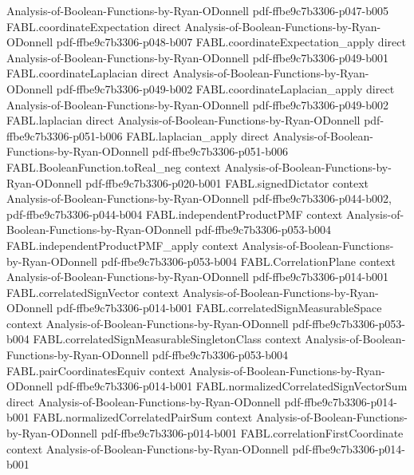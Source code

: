 \begin{theorem}
  {Analysis-of-Boolean-Functions-by-Ryan-ODonnell}
  {pdf-ffbe9c7b3306-p047-b005}
\proofstep
  {FABL.coordinateExpectation}
  {direct}
  {Analysis-of-Boolean-Functions-by-Ryan-ODonnell}
  {pdf-ffbe9c7b3306-p048-b007}
\proofstep
  {FABL.coordinateExpectation_apply}
  {direct}
  {Analysis-of-Boolean-Functions-by-Ryan-ODonnell}
  {pdf-ffbe9c7b3306-p049-b001}
\proofstep
  {FABL.coordinateLaplacian}
  {direct}
  {Analysis-of-Boolean-Functions-by-Ryan-ODonnell}
  {pdf-ffbe9c7b3306-p049-b002}
\proofstep
  {FABL.coordinateLaplacian_apply}
  {direct}
  {Analysis-of-Boolean-Functions-by-Ryan-ODonnell}
  {pdf-ffbe9c7b3306-p049-b002}
\proofstep
  {FABL.laplacian}
  {direct}
  {Analysis-of-Boolean-Functions-by-Ryan-ODonnell}
  {pdf-ffbe9c7b3306-p051-b006}
\proofstep
  {FABL.laplacian_apply}
  {direct}
  {Analysis-of-Boolean-Functions-by-Ryan-ODonnell}
  {pdf-ffbe9c7b3306-p051-b006}
\proofstep
  {FABL.BooleanFunction.toReal_neg}
  {context}
  {Analysis-of-Boolean-Functions-by-Ryan-ODonnell}
  {pdf-ffbe9c7b3306-p020-b001}
\proofstep
  {FABL.signedDictator}
  {context}
  {Analysis-of-Boolean-Functions-by-Ryan-ODonnell}
  {pdf-ffbe9c7b3306-p044-b002,
    pdf-ffbe9c7b3306-p044-b004}
\proofstep
  {FABL.independentProductPMF}
  {context}
  {Analysis-of-Boolean-Functions-by-Ryan-ODonnell}
  {pdf-ffbe9c7b3306-p053-b004}
\proofstep
  {FABL.independentProductPMF_apply}
  {context}
  {Analysis-of-Boolean-Functions-by-Ryan-ODonnell}
  {pdf-ffbe9c7b3306-p053-b004}
\proofstep
  {FABL.CorrelationPlane}
  {context}
  {Analysis-of-Boolean-Functions-by-Ryan-ODonnell}
  {pdf-ffbe9c7b3306-p014-b001}
\proofstep
  {FABL.correlatedSignVector}
  {context}
  {Analysis-of-Boolean-Functions-by-Ryan-ODonnell}
  {pdf-ffbe9c7b3306-p014-b001}
\proofstep
  {FABL.correlatedSignMeasurableSpace}
  {context}
  {Analysis-of-Boolean-Functions-by-Ryan-ODonnell}
  {pdf-ffbe9c7b3306-p053-b004}
\proofstep
  {FABL.correlatedSignMeasurableSingletonClass}
  {context}
  {Analysis-of-Boolean-Functions-by-Ryan-ODonnell}
  {pdf-ffbe9c7b3306-p053-b004}
\proofstep
  {FABL.pairCoordinatesEquiv}
  {context}
  {Analysis-of-Boolean-Functions-by-Ryan-ODonnell}
  {pdf-ffbe9c7b3306-p014-b001}
\proofstep
  {FABL.normalizedCorrelatedSignVectorSum}
  {direct}
  {Analysis-of-Boolean-Functions-by-Ryan-ODonnell}
  {pdf-ffbe9c7b3306-p014-b001}
\proofstep
  {FABL.normalizedCorrelatedPairSum}
  {context}
  {Analysis-of-Boolean-Functions-by-Ryan-ODonnell}
  {pdf-ffbe9c7b3306-p014-b001}
\proofstep
  {FABL.correlationFirstCoordinate}
  {context}
  {Analysis-of-Boolean-Functions-by-Ryan-ODonnell}
  {pdf-ffbe9c7b3306-p014-b001}
\proofstep

\end{theorem}
